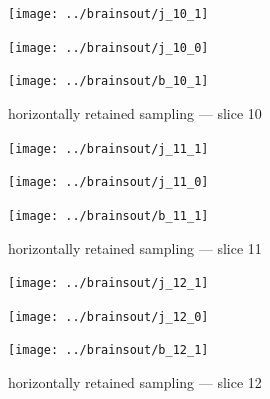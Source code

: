 \documentclass{article}
\begin{document}
\begin{figure}
\begin{centering}

\parbox{\imsize}{\texttt{[image: ../brainsout/j\_10\_1]}}

\vspace{\vertsep}

\parbox{\imsize}{\texttt{[image: ../brainsout/j\_10\_0]}}

\vspace{\vertsep}

\parbox{\imsize}{\texttt{[image: ../brainsout/b\_10\_1]}}

\end{centering}
\caption{horizontally retained sampling --- slice 10}
\end{figure}


\begin{figure}
\begin{centering}

\parbox{\imsize}{\texttt{[image: ../brainsout/j\_11\_1]}}

\vspace{\vertsep}

\parbox{\imsize}{\texttt{[image: ../brainsout/j\_11\_0]}}

\vspace{\vertsep}

\parbox{\imsize}{\texttt{[image: ../brainsout/b\_11\_1]}}

\end{centering}
\caption{horizontally retained sampling --- slice 11}
\end{figure}


\begin{figure}
\begin{centering}

\parbox{\imsize}{\texttt{[image: ../brainsout/j\_12\_1]}}

\vspace{\vertsep}

\parbox{\imsize}{\texttt{[image: ../brainsout/j\_12\_0]}}

\vspace{\vertsep}

\parbox{\imsize}{\texttt{[image: ../brainsout/b\_12\_1]}}

\end{centering}
\caption{horizontally retained sampling --- slice 12}
\end{figure}
\end{document}
